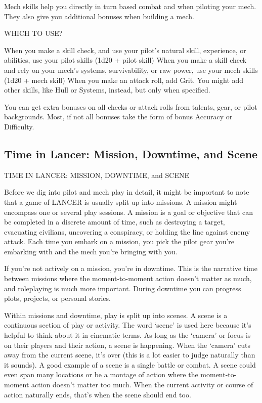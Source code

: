 Mech skills help you directly in turn based combat and when piloting your mech. They also give  
you additional bonuses when building a mech.  

                                              WHICH TO USE? 

When you make a skill check, and use your pilot’s natural skill, experience, or abilities, use your 
pilot skills (1d20 + pilot skill) 
When you make a skill check and rely on your mech’s systems, survivability, or raw power, use 
your mech skills (1d20 + mech skill) 
When you make an attack roll, add Grit. You might add other skills, like Hull or Systems, instead, 
but only when specified. 

You can get extra bonuses on all checks or attack rolls from talents, gear, or pilot backgrounds. 
Most, if not all bonuses take the form of bonus Accuracy or Difficulty. 

\subsection{Time in Lancer: Mission, Downtime, and Scene}         
               TIME IN LANCER: MISSION, DOWNTIME, and SCENE 

Before we dig into pilot and mech play in detail, it might be important to note that a game of 
LANCER is usually split up into missions. A mission might encompass one or several play 
sessions. A mission is a goal or objective that can be completed in a discrete amount of time, 
such as destroying a target, evacuating civilians, uncovering a conspiracy, or holding the line 
against enemy attack. Each time you embark on a mission, you pick the pilot gear you’re 
embarking with and the mech you’re bringing with you. 

If you’re not actively on a mission, you’re in downtime. This is the narrative time between 
missions where the moment-to-moment action doesn’t matter as much, and roleplaying is much 
more important. During downtime you can progress plots, projects, or personal stories. 

Within missions and downtime, play is split up into scenes. A scene is a continuous section of 
play or activity. The word ‘scene’ is used here because it’s helpful to think about it in cinematic 
terms. As long as the ‘camera’ or focus is on their players and their action, a scene is happening. 
When the ‘camera’ cuts away from the current scene, it’s over (this is a lot easier to judge 
naturally than it sounds). A good example of a scene is a single battle or combat. A scene could 
even span many locations or be a montage of action where the moment-to-moment action 
doesn’t matter too much. When the current activity or course of action naturally ends, that’s 
when the scene should end too. 

